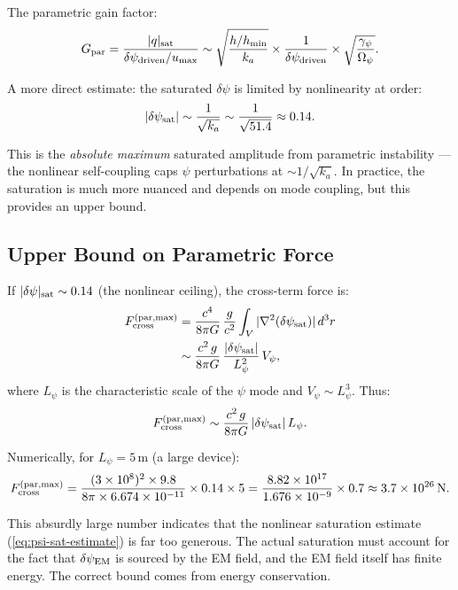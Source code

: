\documentclass[11pt]{article}
\newcommand{\ka}{k_a}
\begin{document}
The parametric gain factor:
\begin{equation}
G_{\rm par} = \frac{|q|_{\rm sat}}{\delta\psi_{\rm driven}/u_{\rm max}}
  \sim \sqrt{\frac{h/h_{\rm min}}{\ka}} \times \frac{1}{\delta\psi_{\rm driven}}
  \times \sqrt{\frac{\gamma_\psi}{\Omega_\psi}}.
\end{equation}

A more direct estimate: the saturated $\delta\psi$ is limited by
nonlinearity at order:
\begin{equation}\label{eq:psi-sat-estimate}
|\delta\psi_{\rm sat}| \sim \frac{1}{\sqrt{\ka}}
  \sim \frac{1}{\sqrt{51.4}} \approx 0.14.
\end{equation}

This is the \textit{absolute maximum} saturated amplitude from parametric
instability --- the nonlinear self-coupling caps $\psi$ perturbations at
$\sim 1/\sqrt{\ka}$. In practice, the saturation is much more nuanced and
depends on mode coupling, but this provides an upper bound.

\subsection{Upper Bound on Parametric Force}

If $|\delta\psi|_{\rm sat} \sim 0.14$ (the nonlinear ceiling), the
cross-term force is:
\begin{align}
F_{\rm cross}^{(\rm par,max)}
  &= \frac{c^4}{8\pi G}\,\frac{g}{c^2}
     \int_V |\nabla^2(\delta\psi_{\rm sat})|\,d^3r \notag \\
  &\sim \frac{c^2\,g}{8\pi G}\,
     \frac{|\delta\psi_{\rm sat}|}{L_\psi^2}\,V_\psi,
\end{align}
where $L_\psi$ is the characteristic scale of the $\psi$ mode and
$V_\psi \sim L_\psi^3$. Thus:
\begin{equation}
F_{\rm cross}^{(\rm par,max)}
  \sim \frac{c^2\,g}{8\pi G}\,|\delta\psi_{\rm sat}|\,L_\psi.
\end{equation}

Numerically, for $L_\psi = 5$\,m (a large device):
\begin{equation}
F_{\rm cross}^{(\rm par,max)}
  = \frac{(3 \times 10^8)^2 \times 9.8}{8\pi \times 6.674 \times 10^{-11}}
    \times 0.14 \times 5
  = \frac{8.82 \times 10^{17}}{1.676 \times 10^{-9}} \times 0.7
  \approx 3.7 \times 10^{26}\,\text{N}.
\end{equation}

This absurdly large number indicates that the nonlinear saturation estimate
(\ref{eq:psi-sat-estimate}) is far too generous. The actual saturation
must account for the fact that $\delta\psi_{\rm EM}$ is sourced by the EM
field, and the EM field itself has finite energy. The correct bound comes
from energy conservation.
\end{document}
